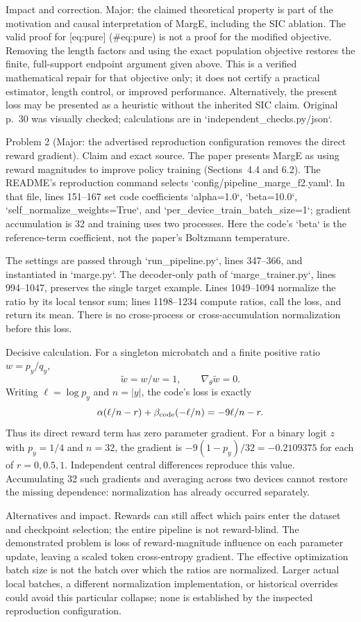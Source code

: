 \documentclass[10pt]{article}
\begin{document}
Impact and correction. Major: the claimed theoretical property is part of the motivation and causal interpretation of MargE, including the SIC ablation. The valid proof for [eq:pure] (\#eq:pure) is not a proof for the modified objective. Removing the length factors and using the exact population objective restores the finite, full-support endpoint argument given above. This is a verified mathematical repair for that objective only; it does not certify a practical estimator, length control, or improved performance. Alternatively, the present loss may be presented as a heuristic without the inherited SIC claim. Original p. 30 was visually checked; calculations are in `independent\_checks.py/json`.\par
Problem 2 (Major: the advertised reproduction configuration removes the direct reward gradient).  Claim and exact source. The paper presents MargE as using reward magnitudes to improve policy training (Sections 4.4 and 6.2). The README’s reproduction command selects `config/pipeline\_marge\_f2.yaml`. In that file, lines 151–167 set code coefficients `alpha=1.0`, `beta=10.0`, `self\_normalize\_weights=True`, and `per\_device\_train\_batch\_size=1`; gradient accumulation is 32 and training uses two processes. Here the code’s `beta` is the reference-term coefficient, not the paper’s Boltzmann temperature.\par
The settings are passed through `run\_pipeline.py`, lines 347–366, and instantiated in `marge.py`. The decoder-only path of `marge\_trainer.py`, lines 994–1047, preserves the single target example. Lines 1049–1094 normalize the ratio by its local tensor sum; lines 1198–1234 compute ratios, call the loss, and return its mean. There is no cross-process or cross-accumulation normalization before this loss.\par
Decisive calculation. For a singleton microbatch and a finite positive ratio \(w=p_y/q_y\), \[\widetilde w=w/w=1,\qquad \nabla_\theta\widetilde w=0.\] Writing \(\ell=\log p_y\) and \(n=|y|\), the code’s loss is exactly \[\alpha(\ell/n-r)+\beta_{\rm code}(-\ell/n)
 =-9\ell/n-r.\] Thus its direct reward term has zero parameter gradient. For a binary logit \(z\) with \(p_y=1/4\) and \(n=32\), the gradient is \(-9(1-p_y)/32=-0.2109375\) for each of \(r=0,0.5,1\). Independent central differences reproduce this value. Accumulating 32 such gradients and averaging across two devices cannot restore the missing dependence: normalization has already occurred separately.\par
Alternatives and impact. Rewards can still affect which pairs enter the dataset and checkpoint selection; the entire pipeline is not reward-blind. The demonstrated problem is loss of reward-magnitude influence on each parameter update, leaving a scaled token cross-entropy gradient. The effective optimization batch size is not the batch over which the ratios are normalized. Larger actual local batches, a different normalization implementation, or historical overrides could avoid this particular collapse; none is established by the inspected reproduction configuration.\par
\end{document}
